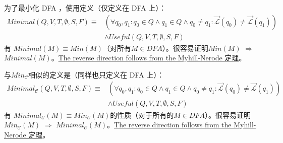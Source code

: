 \begin{property}\label{pro:aldef}
    为了最小化 DFA ，使用定义（仅定义在 DFA 上）：
    \begin{align*}
        Minimal(Q,V,T,\emptyset,S,F)  \equiv & ( \forall q_0,q_1:q_0 \in Q \land q_1 \in Q \land q_0 \not= q_1 : \overrightarrow{\mathcal{L}}(q_0) \not= \overrightarrow{\mathcal{L}}(q_1)  ) \\
                                     & \land Useful(Q,V,T,\emptyset,S,F)
        \end{align*}
有 $Minimal(M) \equiv Min(M)$（对所有$M\in DFA$）。很容易证明$Min(M)$ $\Rightarrow$ $Minimal(M)$。\uline{The reverse direction follows from the Myhill-Nerode 定理}。

与$Min_{\mathcal{C}}$相似的定义是（同样也只定义在 DFA 上）：
    \begin{align*}
        Minimal_{\mathcal{C}}(Q,V,T,\emptyset,S,F)  \equiv & ( \forall q_0,q_1:q_0 \in Q \land q_1 \in Q \land q_0 \not= q_1 : \overrightarrow{\mathcal{L}}(q_0) \not= \overrightarrow{\mathcal{L}}(q_1)  ) \\
                                 & \land Useful(Q,V,T,\emptyset,S,F)
    \end{align*}
有 $Minimal_{\mathcal{C}}(M) \equiv Min_{\mathcal{C}}(M)$的性质（对于所有的$M\in DFA$）。很容易证明$Min_{\mathcal{C}}(M)$ $\Rightarrow$ $Minimal_{\mathcal{C}}(M)$。\uline{The reverse direction follows from the Myhill-Nerode 定理}。
\end{property}


